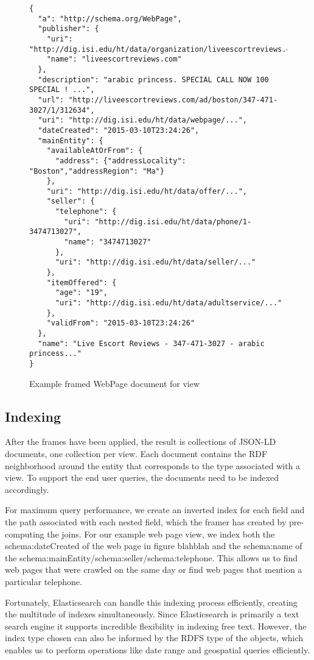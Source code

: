 \begin{figure}
\vspace{-0.2cm}
\begin{verbatim}
{
  "a": "http://schema.org/WebPage",
  "publisher": {
    "uri": "http://dig.isi.edu/ht/data/organization/liveescortreviews.com",
    "name": "liveescortreviews.com"
  },
  "description": "arabic princess. SPECIAL CALL NOW 100 SPECIAL ! ...",
  "url": "http://liveescortreviews.com/ad/boston/347-471-3027/1/312634",
  "uri": "http://dig.isi.edu/ht/data/webpage/...",
  "dateCreated": "2015-03-10T23:24:26",
  "mainEntity": {
    "availableAtOrFrom": {
      "address": {"addressLocality": "Boston","addressRegion": "Ma"}
    },
    "uri": "http://dig.isi.edu/ht/data/offer/...",
    "seller": {
      "telephone": {
        "uri": "http://dig.isi.edu/ht/data/phone/1-3474713027",
        "name": "3474713027"
      },
      "uri": "http://dig.isi.edu/ht/data/seller/..."
    },
    "itemOffered": {
      "age": "19",
      "uri": "http://dig.isi.edu/ht/data/adultservice/..."
    },
    "validFrom": "2015-03-10T23:24:26"
  },
  "name": "Live Escort Reviews - 347-471-3027 - arabic princess..."
}
\end{verbatim}
\vspace{-0.2cm}
\caption{Example framed WebPage document for view}
\label{fig:framed-webpage}
\end{figure}
\subsection{Indexing}
After the frames have been applied, the result is collections of JSON-LD documents, one collection per view.  
Each document contains the RDF neighborhood around the entity that corresponds to the type associated with a view.  
To support the end user queries, the documents need to be indexed accordingly.  

For maximum query performance, we create an inverted index for each field and the path associated with each nested field, which the framer has created by pre-computing the joins.  
For our example web page view,  we index both the schema:dateCreated of the web page in figure blahblah and the schema:name of the schema:mainEntity/schema:seller/schema:telephone.  
This allows us to find web pages that were crawled on the same day or find web pages that mention a particular telephone.  

Fortunately, Elasticsearch can handle this indexing process efficiently, creating the multitude of indexes simultaneously.  
Since Elasticsearch is primarily a text search engine it supports incredible flexibility in indexing free text.  
However, the index type chosen can also be informed by the RDFS type of the objects, which enables us to perform operations like date range and geospatial queries efficiently.

